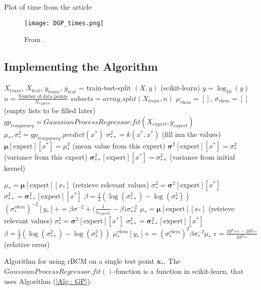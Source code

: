 \documentclass[twoside,english]{uiofysmaster}
\begin{document}
Plot of time from the article 

\begin{figure}
\centering
\texttt{[image: DGP\_times.png]}
\caption{From \cite{deisenroth2015distributed}.}
\end{figure}

\subsection{Implementing the Algorithm}

\begin{algorithm}
$X_{train}$, $X_{test}$, $y_{train}$, $y_{test}$ = train-test-split $(X, y)$ (scikit-learn) \;
$y = \log_{10} (y)$ \;
$n = \frac{\text{Number of data points}}{N_{experts}}$ \;
$subsets = array\_split (X_{train}, n)$ \;
$\mu_{rbcm} = []$, $\sigma_{rbcm} = []$  (empty lists to be filled later)\; 
{
$gp_{temporary} = GaussianProcessRegressor.fit(X_{expert}, y_{expert})$ \;
 {
 $\mu_*,\sigma_*^2 = gp_{temporary}.predict(x^*)$ \;
 $\sigma_{**}^2 = k (x^*, x^*)$ \;
 (fill inn the values) \;
 $\boldsymbol{\mu}[\text{expert}][x^*] = \mu_*^2$ (mean value from this expert)\;
 $\boldsymbol{\sigma}^2[\text{expert}][x^*] = \sigma_*^2$ (variance from this expert)\;
 $\boldsymbol{\sigma}_{**}^2[\text{expert}][x^*] = \sigma_{**}^2$ (variance from initial kernel)
 }
}
 
{ 
{ $\mu_* = \boldsymbol{\mu}[\text{expert}][x_*]$ (retrieve relevant values)\;
$\sigma_*^2 = \boldsymbol{\sigma}^2[\text{expert}][x^*]$ \;
$\sigma_{**}^2 = \boldsymbol{\sigma}_{**}^2[\text{expert}][x^*]$ \; 
$\beta = \frac{1}{2} (\log (\sigma_{**}^2) - \log (\sigma_*^2))$ \;
$(\sigma_*^{rbcm})^{-2}[y_*] += \beta \sigma^{-2} + \big(\frac{1}{n_{experts}} - \beta \big) \sigma_{**}^{-2} $ }
 }  
{
 {
$\mu_* = \boldsymbol{\mu}[\text{expert}][x_*]$ (retrieve relevant values)\;
$\sigma_*^2 = \boldsymbol{\sigma}^2[\text{expert}][x^*]$ \;
$\sigma_{**}^2 = \boldsymbol{\sigma}_{**}^2[\text{expert}][x^*]$ \; 
$\beta = \frac{1}{2} (\log (\sigma_{**}^2) - \log (\sigma_*^2))$ \;
$\mu_*^{rbcm}[y_*] += (\sigma_*^{rbcm})^2 \beta \sigma^{-2}_* \mu_*$
 }
} 
$\epsilon = \frac{10^{\mu_{rbcm}} - 10^{y_{test}}}{10^{y_{test}}}$ (relative error)\;
 \caption{Algorithm for using rBCM on a single test point $\textbf{x}_*$. The $GaussianProcessRegressor.fit()$-function is a function in scikit-learn, that uses Algorithm (\ref{Alg:: GP}). }
\label{Alg:: DGP}
\end{algorithm}
\end{document}
